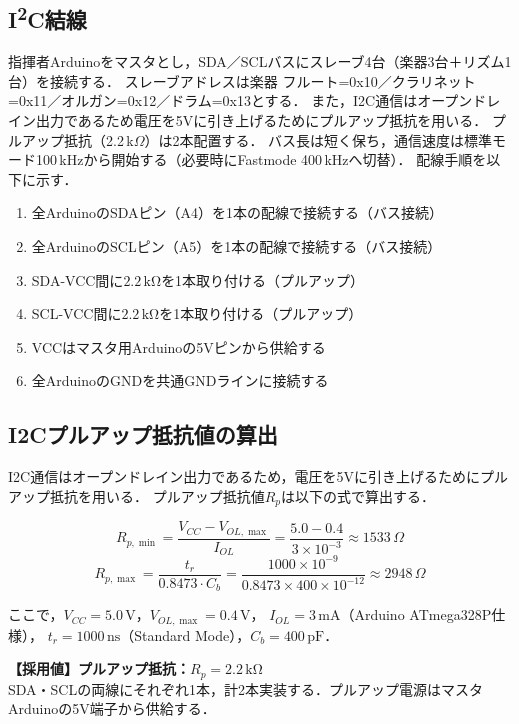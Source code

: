 \documentclass[lualatex,book,paper=a4paper,jafontsize=11.5pt,jafontscale=1.05]{jlreq}
\begin{document}
\subsection{I\textsuperscript{2}C結線}
指揮者Arduinoをマスタとし，SDA／SCLバスにスレーブ4台（楽器3台＋リズム1台）を接続する．
スレーブアドレスは楽器 フルート=0x10／クラリネット=0x11／オルガン=0x12／ドラム=0x13とする．
また，I2C通信はオープンドレイン出力であるため電圧を5Vに引き上げるためにプルアップ抵抗を用いる．
プルアップ抵抗（2.2\,k$\Omega$）は2本配置する．
バス長は短く保ち，通信速度は標準モード100\,kHzから開始する（必要時にFastmode 400\,kHzへ切替）．
配線手順を以下に示す．

\begin{enumerate}
  \item 全ArduinoのSDAピン（A4）を1本の配線で接続する（バス接続）
  \item 全ArduinoのSCLピン（A5）を1本の配線で接続する（バス接続）
  \item SDA-VCC間に$2.2\,\mathrm{k\Omega}$を1本取り付ける（プルアップ）
  \item SCL-VCC間に$2.2\,\mathrm{k\Omega}$を1本取り付ける（プルアップ）
  \item VCCはマスタ用Arduinoの5Vピンから供給する
  \item 全ArduinoのGNDを共通GNDラインに接続する
\end{enumerate}

\subsection{I2Cプルアップ抵抗値の算出}
I2C通信はオープンドレイン出力であるため，電圧を5Vに引き上げるためにプルアップ抵抗を用いる．
プルアップ抵抗値$R_p$は以下の式で算出する．

\[
  R_{p,\min} = \frac{V_{CC} - V_{OL,\max}}{I_{OL}} = \frac{5.0 - 0.4}{3 \times 10^{-3}} \approx 1533\,\Omega
\]
\[
  R_{p,\max} = \frac{t_r}{0.8473 \cdot C_{b}} = \frac{1000 \times 10^{-9}}{0.8473 \times 400 \times 10^{-12}} \approx 2948\,\Omega
\]

ここで，$V_{CC} = 5.0\,\mathrm{V}$，$V_{OL,\max} = 0.4\,\mathrm{V}$，
$I_{OL} = 3\,\mathrm{mA}$（Arduino ATmega328P仕様），
$t_r = 1000\,\mathrm{ns}$（Standard Mode），$C_b = 400\,\mathrm{pF}$．

\medskip
\noindent\textbf{【採用値】プルアップ抵抗：$R_p = 2.2\,\mathrm{k\Omega}$}\\
SDA・SCLの両線にそれぞれ1本，計2本実装する．プルアップ電源はマスタArduinoの5V端子から供給する．
\medskip
\end{document}
